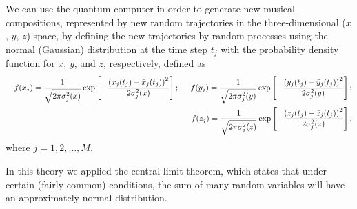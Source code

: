 \documentclass[preprintnumbers,amsmath,amssymb]{revtex4}
\begin{document}
We can use the quantum computer in order to generate new musical
compositions, represented by new random trajectories in the
three-dimensional ($x$, $y$, $z$) space, by defining the new
trajectories by random processes using the normal (Gaussian)
distribution at the time step $t_{j}$ with the probability density
function for $x$, $y$, and $z$, respectively, defined as
\begin{eqnarray}
\label{f} && f(x_{j}) =  \frac{1}{\sqrt{2\pi \sigma_{j}^{2}(x)}}
\exp\left[-\frac{\left(x_{j}(t_{j}) - \bar{x}_{j}(t_{j})
\right)^{2}}{2\sigma_{j}^{2}(x)}\right] ; \hspace{0.5cm} f(y_{j}) =
\frac{1}{\sqrt{2\pi \sigma_{j}^{2}(y)}}
\exp\left[-\frac{\left(y_{j}(t_{j}) -  \bar{y}_{j}(t_{j})
\right)^{2}}{2\sigma_{j}^{2}(y)}\right] ; \nonumber \\
&& f(z_{j}) = \frac{1}{\sqrt{2\pi \sigma_{j}^{2}(z)}}
\exp\left[-\frac{\left(z_{j}(t_{j}) -
\bar{z}_{j}(t_{j})\right)^{2}}{2\sigma_{j}^{2}(z)}\right] ,
\end{eqnarray}
where $j = 1,2, \ldots, M$.

In this theory we applied the central limit theorem, which states
that under certain (fairly common) conditions, the sum of many
random variables will have an approximately normal distribution.
\end{document}
